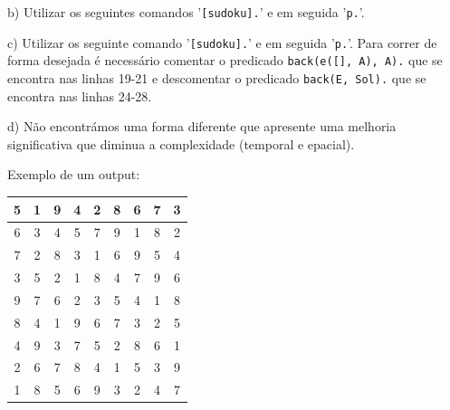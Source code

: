 \documentclass[11pt]{article}
\begin{document}
b) Utilizar os seguintes comandos '\verb|[sudoku].|' e em seguida '\verb|p.|'.

c) Utilizar os seguinte comando '\verb|[sudoku].|' e em seguida '\verb|p.|'. Para correr de forma desejada 
é necessário comentar o predicado \verb|back(e([], A), A).| que se encontra nas linhas 19-21 e descomentar
o predicado \verb|back(E, Sol).| que se encontra nas linhas 24-28.

d) Não encontrámos uma forma diferente que apresente uma melhoria significativa que diminua a
complexidade (temporal e epacial).
\newline

Exemplo de um output:
\begin{table}[h!]
    \begin{center}
        \begin{tabular}{|c|c|c|c|c|c|c|c|c|}
            \hline
            5 & 1 & 9 & 4 & 2 & 8 & 6 & 7 & 3 \\
            \hline
            6 & 3 & 4 & 5 & 7 & 9 & 1 & 8 & 2 \\
            \hline
            7 & 2 & 8 & 3 & 1 & 6 & 9 & 5 & 4 \\
            \hline
            3 & 5 & 2 & 1 & 8 & 4 & 7 & 9 & 6 \\
            \hline
            9 & 7 & 6 & 2 & 3 & 5 & 4 & 1 & 8 \\
            \hline
            8 & 4 & 1 & 9 & 6 & 7 & 3 & 2 & 5 \\
            \hline
            4 & 9 & 3 & 7 & 5 & 2 & 8 & 6 & 1 \\
            \hline
            2 & 6 & 7 & 8 & 4 & 1 & 5 & 3 & 9 \\
            \hline
            1 & 8 & 5 & 6 & 9 & 3 & 2 & 4 & 7 \\
            \hline
        \end{tabular}
    \end{center}
\end{table}
\end{document}
